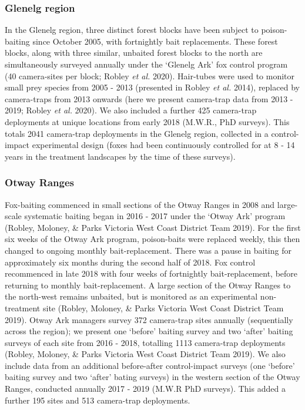 \documentclass[]{elsarticle} %
\begin{document}
\hypertarget{glenelg-region-1}{%
\subsubsection{Glenelg region}\label{glenelg-region-1}}

In the Glenelg region, three distinct forest blocks have been subject to poison-baiting since October 2005, with fortnightly bait replacements. These forest blocks, along with three similar, unbaited forest blocks to the north are simultaneously surveyed annually under the `Glenelg Ark' fox control program (40 camera-sites per block; Robley \emph{et al.} 2020). Hair-tubes were used to monitor small prey species from 2005 - 2013 (presented in Robley \emph{et al.} 2014), replaced by camera-traps from 2013 onwards (here we present camera-trap data from 2013 - 2019; Robley \emph{et al.} 2020). We also included a further 425 camera-trap deployments at unique locations from early 2018 (M.W.R., PhD surveys). This totals 2041 camera-trap deployments in the Glenelg region, collected in a control-impact experimental design (foxes had been continuously controlled for at 8 - 14 years in the treatment landscapes by the time of these surveys).

\hypertarget{otway-ranges-1}{%
\subsubsection{Otway Ranges}\label{otway-ranges-1}}

Fox-baiting commenced in small sections of the Otway Ranges in 2008 and large-scale systematic baiting began in 2016 - 2017 under the `Otway Ark' program (Robley, Moloney, \& Parks Victoria West Coast District Team 2019). For the first six weeks of the Otway Ark program, poison-baits were replaced weekly, this then changed to ongoing monthly bait-replacement. There was a pause in baiting for approximately six months during the second half of 2018. Fox control recommenced in late 2018 with four weeks of fortnightly bait-replacement, before returning to monthly bait-replacement. A large section of the Otway Ranges to the north-west remains unbaited, but is monitored as an experimental non-treatment site (Robley, Moloney, \& Parks Victoria West Coast District Team 2019). Otway Ark managers survey 372 camera-trap sites annually (sequentially across the region); we present one `before' baiting survey and two `after' baiting surveys of each site from 2016 - 2018, totalling 1113 camera-trap deployments (Robley, Moloney, \& Parks Victoria West Coast District Team 2019). We also include data from an additional before-after control-impact surveys (one `before' baiting survey and two `after' bating surveys) in the western section of the Otway Ranges, conducted annually 2017 - 2019 (M.W.R PhD surveys). This added a further 195 sites and 513 camera-trap deployments.
\end{document}
